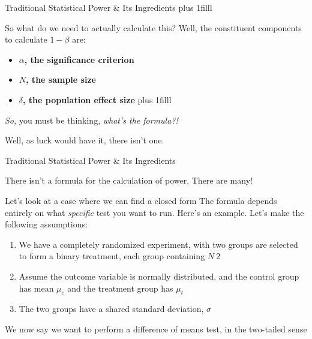 \documentclass[
  ignorenonframetext,
  aspectratio=169,
]{beamer}
\providecommand{\tightlist}{%
  \setlength{\itemsep}{0pt}\setlength{\parskip}{0pt}}\usepackage{longtable,booktabs,array}
\begin{document}
\begin{frame}{Traditional Statistical Power \& Its Ingredients}
\label{traditional-statistical-power-its-ingredients-2}
\vskip0pt plus 1filll

So what do we need to actually calculate this? Well, the constituent
components to calculate \(1 - \beta\) are:

\begin{itemize}
\tightlist
\item
  \textbf{$\alpha$, the significance criterion}
\item
  \textbf{$N$, the sample size}
\item
  \textbf{$\delta$, the population effect size} \vskip0pt plus 1filll
\end{itemize}

\begin{center}
\textit{So,} you must be thinking, \textit{what's the formula?!}

Well, as luck would have it, there isn't one. 
\end{center}
\end{frame}

\begin{frame}{Traditional Statistical Power \& Its Ingredients}
\label{traditional-statistical-power-its-ingredients-3}
\begin{center}
\Large
There isn't a formula for the calculation of power. There are many!
\end{center}
\end{frame}

\begin{frame}{Let's look at a case where we can find a closed form}
\label{lets-look-at-a-case-where-we-can-find-a-closed-form}
The formula depends entirely on what \emph{specific} test you want to
run. Here's an example. Let's make the following assumptions:

\begin{enumerate}
\tightlist
\item
  We have a completely randomized experiment, with two groups are
  selected to form a binary treatment, each group containing \(N \ 2\)
\item
  Assume the outcome variable is normally distributed, and the control
  group has mean \(\mu_c\) and the treatment group has \(\mu_t\)
\item
  The two groups have a shared standard deviation, \(\sigma\)
\end{enumerate}

We now say we want to perform a difference of means test, in the
two-tailed sense
\end{frame}
\end{document}
